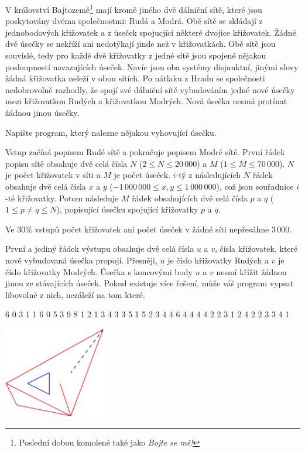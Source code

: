 





V království Bajtozemě\footnote{Poslední dobou komolené také jako \textit{Bojte se mě!}}
mají kromě jiného dvě dálniční sítě,
které jsou poskytovány dvěma společnostmi: Rudá a Modrá.
Obě sítě se skládají z jednobodových křižovatek a z úseček spojucjící
některé dvojice křižovatek. Žádné dvě úsečky se nekříží ani nedotýkají jinde než
v křižovatkách. Obě sítě jsou souvislé, tedy pro každé dvě křižovatky z jedné sítě
jsou spojené nějakou posloupností navazujících úseček. Navíc jsou oba systémy
disjunktní, jinými slovy žádná křižovatka neleží v obou sítích.
Po nátlaku z Hradu se společnosti nedobrovolně rozhodly,
že spojí své dálniční sítě vybudováním jedné nové úsečky mezi křižovatkou
Rudých a křižovatkou Modrých. Nová úsečka nesmá protínat žádnou jinou úsečky.

Napište program, který nalezne nějakou vyhovující úsečku.

Vstup začíná popisem Rudé sítě a pokračuje popisem Modré sítě.
První řádek popisu sítě obsahuje dvě celá čísla $N$ ($2 \leq N \leq 20\,000$) a
$M$ ($1 \leq M \leq 70\,000$). $N$ je počet křižovatek v síti a $M$ je počet
úseček. $i$-tý z následujících $N$ řádek obsahuje dvě celá čísla $x$ a $y$
($-1\,000\,000 \leq x,y \leq 1\,000\,000$), což jsou souřadnice $i$-té křižovatky.
Potom následuje $M$ řádek obsahujících dvě celá čísla $p$ a $q$
($1\leq p \neq q \leq N$), popisující úsečku spojující křižovatky $p$ a $q$.

\bigskip
Ve $30\%$ vstupů počet křižovatek ani počet úseček v žádné síti nepřesáhne $3\,000$.

První a jediný řádek výstupu obsahuje dvě celá čísla $u$ a $v$,
čísla křižovatek, které nově vybudovaná úsečka propojí.
Přesněji, $u$ je číslo křižovatky Rudých a $v$ je číslo křižovatky Modrých.
Úsečka s koncovými body $u$ a $v$ nesmí křížit žádnou jinou ze stávajících úseček.
Pokud existuje více řešení, může váš program vypsat libovolné z nich,
nezáleží na tom které.


 6
0 3
1 1
6 0
5 3
9 8
1 2
1 3
4 3
3 5
1 5
2 3
4 4
6 4
4 4
4 2
2 3
1 2
4 2
2 3
3 4
 1
\sampleCOMMENT

\includegraphics[height=4cm]{img/fig11.pdf}
\sampleEND


